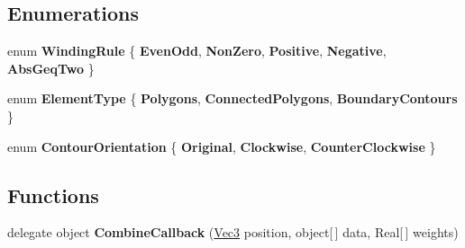 \subsection*{Enumerations}
\begin{DoxyCompactItemize}
\item 
\mbox{\label{namespace_super_tiled2_unity_1_1_editor_1_1_lib_tess_dot_net_a60fb890dfc54e67db0eab03180be4597}} 
enum {\bfseries Winding\+Rule} \{ \newline
{\bfseries Even\+Odd}, 
{\bfseries Non\+Zero}, 
{\bfseries Positive}, 
{\bfseries Negative}, 
\newline
{\bfseries Abs\+Geq\+Two}
 \}
\item 
\mbox{\label{namespace_super_tiled2_unity_1_1_editor_1_1_lib_tess_dot_net_aca98b44bd7733de7ad408d7a37c5cf92}} 
enum {\bfseries Element\+Type} \{ {\bfseries Polygons}, 
{\bfseries Connected\+Polygons}, 
{\bfseries Boundary\+Contours}
 \}
\item 
\mbox{\label{namespace_super_tiled2_unity_1_1_editor_1_1_lib_tess_dot_net_a4d01835350d240d440e7b0a3bdd4bc39}} 
enum {\bfseries Contour\+Orientation} \{ {\bfseries Original}, 
{\bfseries Clockwise}, 
{\bfseries Counter\+Clockwise}
 \}
\end{DoxyCompactItemize}
\subsection*{Functions}
\begin{DoxyCompactItemize}
\item 
\mbox{\label{namespace_super_tiled2_unity_1_1_editor_1_1_lib_tess_dot_net_a17da335debb44c02351f0703a267bd21}} 
delegate object {\bfseries Combine\+Callback} (\mbox{\hyperlink{struct_super_tiled2_unity_1_1_editor_1_1_lib_tess_dot_net_1_1_vec3}{Vec3}} position, object\mbox{[}$\,$\mbox{]} data, Real\mbox{[}$\,$\mbox{]} weights)
\end{DoxyCompactItemize}
